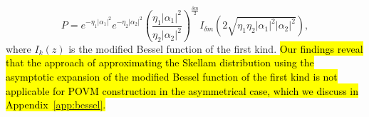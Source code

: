 \begin{equation}
  P=e^{-\eta_1|\alpha_1|^2}e^{-\eta_2|\alpha_2|^2}
\left(\frac{\eta_1|\alpha_1|^2}{\eta_2|\alpha_2|^2}\right)^{\frac{\delta m}{2}}
I_{\delta m}\left(2\sqrt{\eta_1\eta_2|\alpha_1|^2|\alpha_2|^2}\right),\label{eq:accurate}
\end{equation}
where $I_k(z)$ is the modified Bessel function of the first kind. %
\hl{Our findings reveal that the approach of approximating the Skellam distribution using the asymptotic expansion of the modified Bessel function of the first kind is not applicable for POVM construction in the asymmetrical case, which we discuss in Appendix{~\ref{app:bessel}}.}

